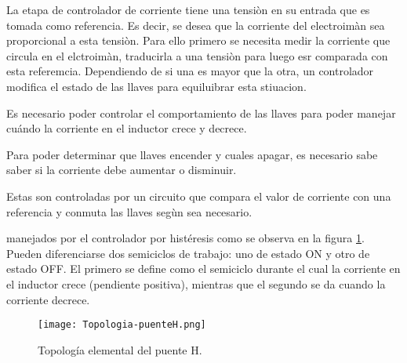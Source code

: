 La etapa de controlador de corriente tiene una tensiòn en su entrada que es tomada como referencia. Es decir, se desea que la corriente del electroimàn sea proporcional a esta tensiòn. Para ello primero se necesita medir la corriente que circula en el elctroimàn, traducirla a una tensiòn para luego esr comparada con esta referemcia. Dependiendo de si una es mayor que la otra, un controlador modifica el estado de las llaves para equiluibrar esta stiuacion. 

Es necesario poder controlar el comportamiento de las llaves para poder manejar cuándo la corriente en el inductor crece y decrece. 

Para poder determinar que llaves encender y cuales apagar, es necesario sabe saber si la corriente debe aumentar o disminuir.

Estas son controladas por un circuito que compara el valor de corriente con una referencia y conmuta las llaves segùn sea necesario.

 manejados por el controlador por histéresis como se observa en la figura \ref{fig:img_topologia-puenteH}. Pueden diferenciarse dos semiciclos de trabajo: uno de estado ON y otro de estado OFF. El primero se define como el semiciclo durante el cual la corriente en el inductor crece (pendiente positiva), mientras que el segundo se da cuando la corriente decrece.

\begin{figure}[H]
	\centering
	\texttt{[image: Topologia-puenteH.png]}
	\caption{Topología elemental del puente H.}
	\label{fig:img_topologia-puenteH}
\end{figure}
